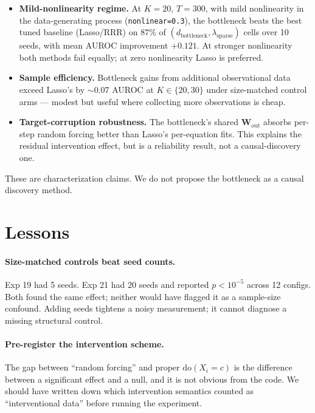 \documentclass{article}
\begin{document}
\begin{itemize}[leftmargin=1.5em, topsep=2pt, itemsep=2pt]
  \item \textbf{Mild-nonlinearity regime.} At $K{=}20$, $T{=}300$,
  with mild nonlinearity in the data-generating process
  (\texttt{nonlinear=0.3}), the bottleneck beats the best tuned
  baseline (Lasso/RRR) on $87\%$ of $(d_{\text{bottleneck}},
  \lambda_{\text{sparse}})$ cells over 10 seeds, with mean AUROC
  improvement $+0.121$. At stronger nonlinearity both methods fail
  equally; at zero nonlinearity Lasso is preferred.
  \item \textbf{Sample efficiency.} Bottleneck gains from additional
  observational data exceed Lasso's by $\sim 0.07$ AUROC at
  $K \in \{20, 30\}$ under size-matched control arms — modest but
  useful where collecting more observations is cheap.
  \item \textbf{Target-corruption robustness.} The bottleneck's shared
  $\mathbf{W}_{\text{out}}$ absorbs per-step random forcing better
  than Lasso's per-equation fits. This explains the residual
  intervention effect, but is a reliability result, not a
  causal-discovery one.
\end{itemize}

These are characterization claims. We do not propose the bottleneck as
a causal discovery method.

\section{Lessons}

\paragraph{Size-matched controls beat seed counts.} Exp 19 had 5 seeds.
Exp 21 had 20 seeds and reported $p < 10^{-5}$ across 12 configs. Both
found the same effect; neither would have flagged it as a sample-size
confound. Adding seeds tightens a noisy measurement; it cannot diagnose
a missing structural control.

\paragraph{Pre-register the intervention scheme.} The gap between
``random forcing'' and proper $\text{do}(X_i = c)$ is the difference
between a significant effect and a null, and it is not obvious from the
code. We should have written down which intervention semantics counted
as ``interventional data'' before running the experiment.
\end{document}
